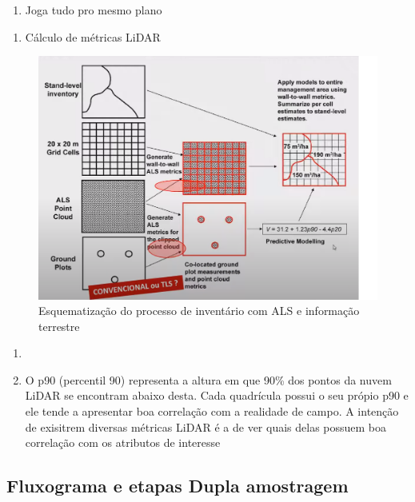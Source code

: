 \documentclass[
]{article}
\providecommand{\tightlist}{%
  \setlength{\itemsep}{0pt}\setlength{\parskip}{0pt}}
\begin{document}
\begin{enumerate}
\def\labelenumi{\roman{enumi}.}
\tightlist
\item
  Joga tudo pro mesmo plano
\end{enumerate}

\begin{enumerate}
\def\labelenumi{\arabic{enumi}.}
\setcounter{enumi}{8}
\tightlist
\item
  Cálculo de métricas LiDAR
\end{enumerate}

\begin{figure}

{\centering \includegraphics[width=0.8\linewidth]{IMAGES/als-e-info-campo} 

}

\caption{Esquematização do processo de inventário com ALS e informação terrestre}\label{fig:unnamed-chunk-8}
\end{figure}

\begin{enumerate}
\def\labelenumi{\roman{enumi}.}
\tightlist
\item
\item
  O p90 (percentil 90) representa a altura em que 90\% dos pontos da
  nuvem LiDAR se encontram abaixo desta. Cada quadrícula possui o seu
  própio p90 e ele tende a apresentar boa correlação com a realidade de
  campo. A intenção de exisitrem diversas métricas LiDAR é a de ver
  quais delas possuem boa correlação com os atributos de interesse
\end{enumerate}

\newpage

\subsection{Fluxograma e etapas Dupla
amostragem}\label{fluxograma-e-etapas-dupla-amostragem}
\end{document}
